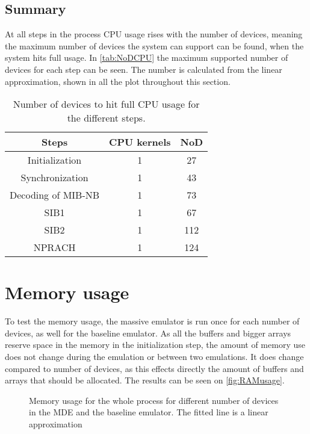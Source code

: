 \subsection{Summary}
At all steps in the process CPU usage rises with the number of devices, meaning the maximum number of devices the system can support can be found, when the system hits full usage. In \autoref{tab:NoDCPU} the maximum supported number of devices for each step can be seen. The number is calculated from the linear approximation, shown in all the plot throughout this section.

\begin{table}[H]
\centering
\begin{tabular}{|c|c|c|}
\hline
Steps & CPU kernels & NoD \\
\hline
Initialization & 1 & 27 \\
\hline
Synchronization & 1 & 43 \\
\hline
Decoding of MIB-NB & 1 & 73 \\
\hline
SIB1 & 1 & 67 \\
\hline
SIB2 & 1 & 112 \\
\hline
NPRACH & 1 & 124 \\
\hline
\end{tabular}
\caption{Number of devices to hit full CPU usage for the different steps.}
\label{tab:NoDCPU}
\end{table}

\section{Memory usage}
To test the memory usage, the massive emulator is run once for each number of devices, as well for the baseline emulator. As all the buffers and bigger arrays reserve space in the memory in the initialization step, the amount of memory use does not change during the emulation or between two emulations. It does change compared to number of devices, as this effects directly the amount of buffers and arrays that should be allocated. The results can be seen on \autoref{fig:RAMusage}.

\begin{figure}[H]
\centering
\resizebox{0.5\textwidth}{!}{
}
\caption{Memory usage for the whole process for different number of devices in the MDE and the baseline emulator. The fitted line is a linear approximation}
\label{fig:RAMusage}
\end{figure}

